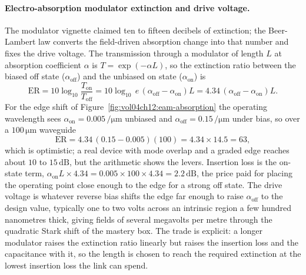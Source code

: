\paragraph{Electro-absorption modulator extinction and drive voltage.}
The modulator vignette claimed ten to fifteen decibels of extinction; the
Beer-Lambert law converts the field-driven absorption change into that number and
fixes the drive voltage. The transmission through a modulator of length $L$ at
absorption coefficient $\alpha$ is $T = \exp(-\alpha L)$, so the extinction ratio
between the biased off state ($\alpha_{\text{off}}$) and the unbiased on state
($\alpha_{\text{on}}$) is
\[
\text{ER} = 10\log_{10}\frac{T_{\text{on}}}{T_{\text{off}}}
          = 10\log_{10}\,e\,(\alpha_{\text{off}} - \alpha_{\text{on}})L
          = 4.34\,(\alpha_{\text{off}} - \alpha_{\text{on}})L.
\]
For the edge shift of Figure~\ref{fig:vol04ch12:eam-absorption} the operating
wavelength sees $\alpha_{\text{on}} = 0.005\,\si{\per\micro\meter}$ unbiased and
$\alpha_{\text{off}} = 0.15\,\si{\per\micro\meter}$ under bias, so over a
$100\,\si{\micro\meter}$ waveguide
\[
\text{ER} = 4.34\,(0.15 - 0.005)(100) = 4.34\times 14.5 = 63,
\]
which is optimistic; a real device with mode overlap and a graded edge reaches
about $10$ to $15\,\text{dB}$, but the arithmetic shows the levers. Insertion loss
is the on-state term, $\alpha_{\text{on}}L\times 4.34 = 0.005\times 100\times
4.34 = 2.2\,\text{dB}$, the price paid for placing the operating point close
enough to the edge for a strong off state. The drive voltage is whatever reverse
bias shifts the edge far enough to raise $\alpha_{\text{off}}$ to the design
value, typically one to two volts across an intrinsic region a few hundred
nanometres thick, giving fields of several megavolts per metre through the
quadratic Stark shift of the mastery box. The trade is explicit: a longer
modulator raises the extinction ratio linearly but raises the insertion loss and
the capacitance with it, so the length is chosen to reach the required extinction
at the lowest insertion loss the link can spend.

